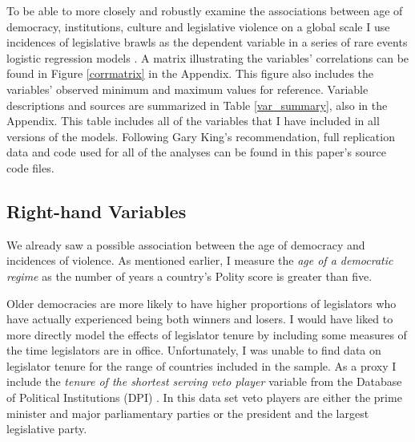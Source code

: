 \documentclass[a4paper]{article}\usepackage{graphicx, color}
\begin{document}
To be able to more closely and robustly examine the associations between age of democracy, institutions, culture and legislative violence on a global scale I use incidences of legislative brawls as the dependent variable in a series of rare events logistic regression models \citep{KingRareEvents2001, KingRareEventsPA2001}. A matrix illustrating the variables' correlations can be found in Figure \ref{corrmatrix} in the Appendix. This figure also includes the variables' observed minimum and maximum values for reference. Variable descriptions and sources are summarized in Table \ref{var_summary}, also in the Appendix. This table includes all of the variables that I have included in all versions of the models.  Following Gary King's \citeyearpar{King1995} recommendation, full replication data and code used for all of the analyses can be found in this paper's source code files.

\subsection{Right-hand Variables}

We already saw a possible association between the age of democracy and incidences of violence. As mentioned earlier, I measure the {\emph{age of a democratic regime}} as the number of years a country's Polity score is greater than five.

Older democracies are more likely to have higher proportions of legislators who have actually experienced being both winners and losers. I would have liked to more directly model the effects of legislator tenure by including some measures of the time legislators are in office. Unfortunately, I was unable to find data on legislator tenure for the range of countries included in the sample. As a proxy I include the {\emph{tenure of the shortest serving veto player}} variable from the Database of Political Institutions (DPI) \citep[updated to 2010]{DPI2001}. In this data set veto players are either the prime minister and major parliamentary parties or the president and the largest legislative party.
\end{document}
